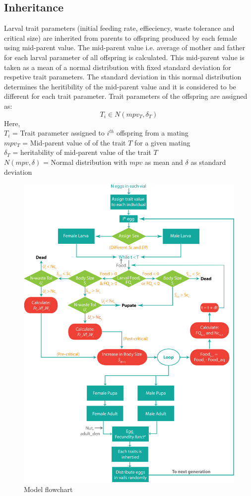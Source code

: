 \subsection{Inheritance}
Larval trait parameters (initial feeding rate, effieciency, waste tolerance and critical size) are inherited from parents to offspring produced by each female using mid-parent value. The mid-parent value i.e. average of mother and father for each larval parameter of all offspring is calculated. This mid-parent value is taken as a mean of a normal distribution with fixed standard deviation for respetive trait parameters. The standard deviation in this normal distribution determines the heritibility of the mid-parent value and it is considered to be different for each trait parameter. Trait parameters of the offspring are assigned as:
\[T_{i} \in N(mpv_{T}, \delta_{T})\]
Here, \\
$T_{i}$ = Trait parameter assigned to $i^{th}$ offspring from a mating \\
$mpv_{T}$ = Mid-parent value of of the trait $T$ for a given mating \\
$\delta_{T}$ = heritability of mid-parent value of the trait $T$ \\
$N(mpv, \delta)$ = Normal distribution with $mpv$ as mean and $\delta$ as standard deviation
\begin{figure}[p]
  \centering
  \includegraphics[trim= 0 0 0 0, clip, width= \textwidth]{C4/Figs/model}
  \caption{Model flowchart}
  \label{model}
\end{figure}

